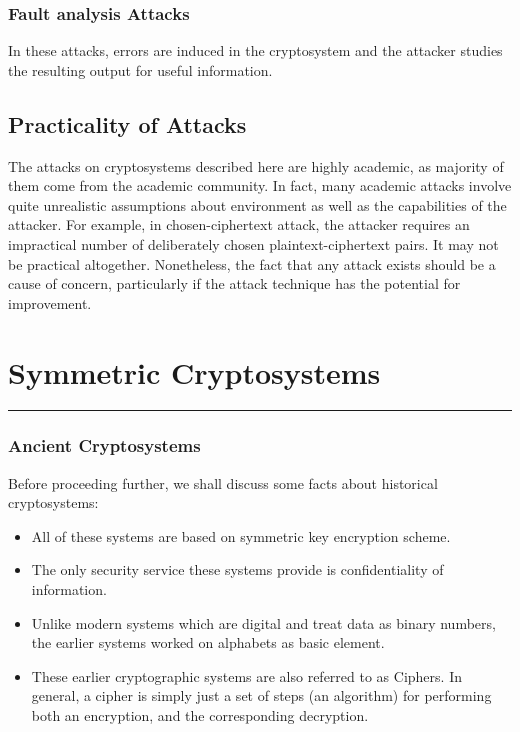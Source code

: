 \documentclass[british]{article}
\begin{document}
\subsubsection{Fault analysis Attacks}

In these attacks, errors are induced in the cryptosystem and the attacker
studies the resulting output for useful information.

\subsection{Practicality of Attacks}

The attacks on cryptosystems described here are highly academic, as
majority of them come from the academic community. In fact, many academic
attacks involve quite unrealistic assumptions about environment as
well as the capabilities of the attacker. For example, in chosen-ciphertext
attack, the attacker requires an impractical number of deliberately
chosen plaintext-ciphertext pairs. It may not be practical altogether.
Nonetheless, the fact that any attack exists should be a cause of
concern, particularly if the attack technique has the potential for
improvement.

\vfill{}

\pagebreak{}

\section{Symmetric Cryptosystems}
\begin{center}
\rule[0.5ex]{450bp}{0.75pt} 
\par\end{center}

\subsubsection{Ancient Cryptosystems}

Before proceeding further, we shall discuss some facts about historical
cryptosystems:
\begin{itemize}
\item All of these systems are based on symmetric key encryption scheme.
\item The only security service these systems provide is confidentiality
of information.
\item Unlike modern systems which are digital and treat data as binary numbers,
the earlier systems worked on alphabets as basic element.
\item These earlier cryptographic systems are also referred to as Ciphers.
In general, a cipher is simply just a set of steps (an algorithm)
for performing both an encryption, and the corresponding decryption.
\end{itemize}
\end{document}
